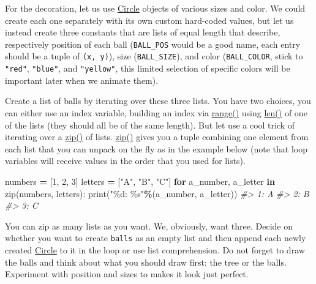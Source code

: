 \documentclass[
]{book}
\newenvironment{Shaded}{\begin{snugshade}}{\end{snugshade}}
\newcommand{\BuiltInTok}[1]{#1}
\newcommand{\CommentTok}[1]{\textcolor[rgb]{0.56,0.35,0.01}{\textit{#1}}}
\newcommand{\ControlFlowTok}[1]{\textcolor[rgb]{0.13,0.29,0.53}{\textbf{#1}}}
\newcommand{\DecValTok}[1]{\textcolor[rgb]{0.00,0.00,0.81}{#1}}
\newcommand{\KeywordTok}[1]{\textcolor[rgb]{0.13,0.29,0.53}{\textbf{#1}}}
\newcommand{\NormalTok}[1]{#1}
\newcommand{\OperatorTok}[1]{\textcolor[rgb]{0.81,0.36,0.00}{\textbf{#1}}}
\newcommand{\SpecialCharTok}[1]{\textcolor[rgb]{0.00,0.00,0.00}{#1}}
\newcommand{\StringTok}[1]{\textcolor[rgb]{0.31,0.60,0.02}{#1}}
\begin{document}
For the decoration, let us use \href{https://psychopy.org/api/visual/circle.html\#psychopy.visual.circle.Circle}{Circle} objects of various sizes and color. We could create each one separately with its own custom hard-coded values, but let us instead create three constants that are lists of equal length that describe, respectively position of each ball (\texttt{BALL\_POS} would be a good name, each entry should be a tuple of \texttt{(x,\ y)}), size (\texttt{BALL\_SIZE}), and color (\texttt{BALL\_COLOR}, stick to \texttt{"red"}, \texttt{"blue"}, and \texttt{"yellow"}, this limited selection of specific colors will be important later when we animate them).

Create a list of balls by iterating over these three lists. You have two choices, you can either use an index variable, building an index via \href{https://docs.python.org/3/library/functions.html\#func-range}{range()} using \href{https://docs.python.org/3/library/functions.html\#len}{len()} of one of the lists (they should all be of the same length). But let use a cool trick of iterating over a \href{https://docs.python.org/3/library/functions.html\#zip}{zip()} of lists. \href{https://docs.python.org/3/library/functions.html\#zip}{zip()} gives you a tuple combining one element from each list that you can unpack on the fly as in the example below (note that loop variables will receive values in the order that you used for lists).

\begin{Shaded}
\begin{Highlighting}[]
\NormalTok{numbers }\OperatorTok{=}\NormalTok{ [}\DecValTok{1}\NormalTok{, }\DecValTok{2}\NormalTok{, }\DecValTok{3}\NormalTok{]}
\NormalTok{letters }\OperatorTok{=}\NormalTok{ [}\StringTok{"A"}\NormalTok{, }\StringTok{"B"}\NormalTok{, }\StringTok{"C"}\NormalTok{]}
\ControlFlowTok{for}\NormalTok{  a\_number, a\_letter }\KeywordTok{in}  \BuiltInTok{zip}\NormalTok{(numbers, letters):}
  \BuiltInTok{print}\NormalTok{(}\StringTok{"}\SpecialCharTok{\%d}\StringTok{: }\SpecialCharTok{\%s}\StringTok{"}\OperatorTok{\%}\NormalTok{(a\_number, a\_letter))}
\CommentTok{\#\textgreater{} 1: A}
\CommentTok{\#\textgreater{} 2: B}
\CommentTok{\#\textgreater{} 3: C}
\end{Highlighting}
\end{Shaded}

You can zip as many lists as you want. We, obviously, want three. Decide on whether you want to create \texttt{balls} as an empty list and then append each newly created \href{https://psychopy.org/api/visual/circle.html\#psychopy.visual.circle.Circle}{Circle} to it in the loop or use list comprehension. Do not forget to draw the balls and think about what you should draw first: the tree or the balls. Experiment with position and sizes to makes it look just perfect.
\end{document}
